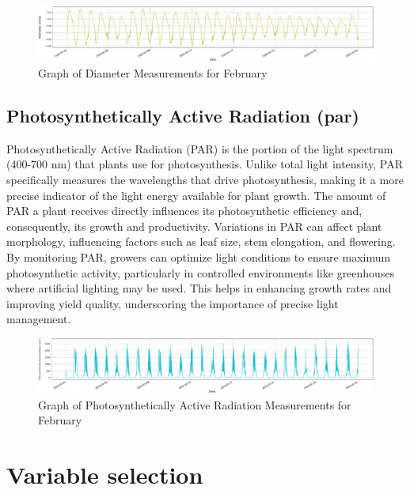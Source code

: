 \begin{figure}[htbp]
    \centering
    \includegraphics[width=15 cm]{4_ChapterMaterials/figuras/train_data_Diameter.pdf}
    \caption{Graph of Diameter Measurements for February}
    \end{figure}

\subsection{Photosynthetically Active Radiation (par)}

Photosynthetically Active Radiation (PAR) is the portion of the light spectrum (400-700 nm) that plants use for photosynthesis. Unlike total light intensity, PAR specifically measures the wavelengths that drive photosynthesis, making it a more precise indicator of the light energy available for plant growth. The amount of PAR a plant receives directly influences its photosynthetic efficiency and, consequently, its growth and productivity. Variations in PAR can affect plant morphology, influencing factors such as leaf size, stem elongation, and flowering. By monitoring PAR, growers can optimize light conditions to ensure maximum photosynthetic activity, particularly in controlled environments like greenhouses where artificial lighting may be used. This helps in enhancing growth rates and improving yield quality, underscoring the importance of precise light management.

\begin{figure}[htbp]
    \centering
    \includegraphics[width=15 cm]{4_ChapterMaterials/figuras/train_data_Photosynthetically_Active_Radiation.pdf}
    \caption{Graph of Photosynthetically Active Radiation Measurements for February}
    \end{figure}

\section{Variable selection}

